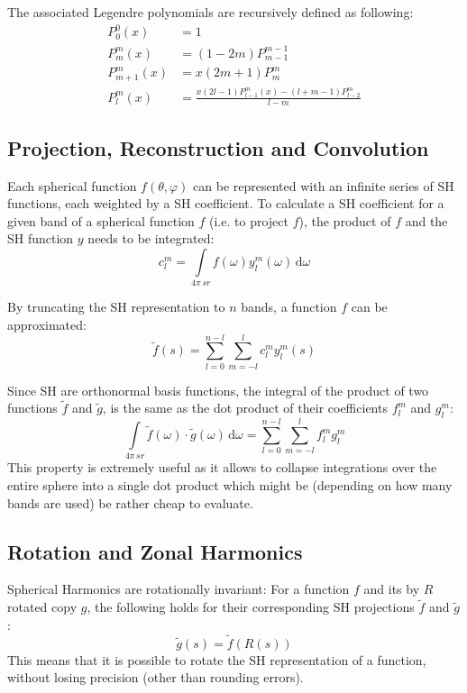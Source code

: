 \documentclass[thesis.tex]{subfiles}
\begin{document}
The associated Legendre polynomials are recursively defined as following:
\begin{equation}
	\begin{alignedat}{2}
		P^0_0(x) &= 1\\
		P^m_m(x) &= (1-2m)P^{m-1}_{m-1}\\
		P^m_{m+1}(x) &= x(2m+1)P^m_m\\	
		P^m_l(x) &= \frac{x(2l-1)P^m_{l-1}(x)-(l+m-1)P^m_{l-2}}{l-m}
	\end{alignedat}
\end{equation}


\subsection{Projection, Reconstruction and Convolution} \label{sec:preq:shprojectrecon}
Each spherical function $f(\theta, \varphi)$ can be represented with an infinite series of SH functions, each weighted by a SH coefficient.
To calculate a SH coefficient for a given band of a spherical function $f$ (i.e. to project $f$), the product of $f$ and the SH function $y$ needs to be integrated:
\begin{equation} \label{eq:shprojection}
	c^m_l=\int\limits_{4\pi\,sr} f(\omega)y^m_l(\omega)\, \mathrm{d}\omega
\end{equation}

By truncating the SH representation to $n$ bands, a function $f$ can be approximated:
\begin{equation}
	\widetilde{f}(s) = \sum_{l=0}^{n-l}\sum_{m=-l}^l c_l^m y_l^m(s)
\end{equation}

Since SH are orthonormal basis functions, the integral of the product of two functions $\widetilde{f}$ and $\widetilde{g}$, is the same as the dot product of their coefficients $f_l^m$ and $g_l^m$:
\begin{equation}
	\int\limits_{4\pi\,sr} \widetilde{f}(\omega) \cdot \widetilde{g}(\omega) \, \mathrm{d}\omega =
	\sum_{l=0}^{n-l}\sum_{m=-l}^l f_l^m g_l^m
\end{equation}
This property is extremely useful as it allows to collapse integrations over the entire sphere into a single dot product which might be (depending on how many bands are used) be rather cheap to evaluate.

\subsection{Rotation and Zonal Harmonics} \label{sec:preq:zonalharmonics}
Spherical Harmonics are rotationally invariant:
For a function $f$ and its by $R$ rotated copy $g$, the following holds for their corresponding SH projections $\widetilde{f}$ and $\widetilde{g}$:
\begin{equation}
\widetilde{g}(s) = \widetilde{f}(R(s))
\end{equation}
This means that it is possible to rotate the SH representation of a function, without losing precision (other than rounding errors).
\end{document}
